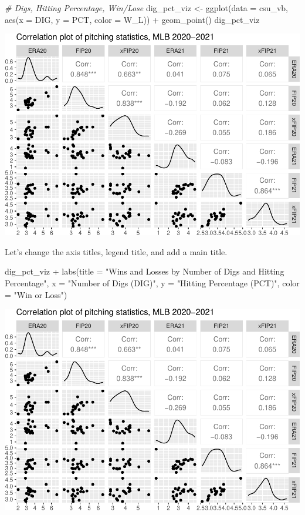 \documentclass[
  11pt,
]{book}
\newenvironment{Shaded}{\begin{snugshade}}{\end{snugshade}}
\newcommand{\AttributeTok}[1]{\textcolor[rgb]{0.77,0.63,0.00}{#1}}
\newcommand{\CommentTok}[1]{\textcolor[rgb]{0.56,0.35,0.01}{\textit{#1}}}
\newcommand{\FunctionTok}[1]{\textcolor[rgb]{0.00,0.00,0.00}{#1}}
\newcommand{\NormalTok}[1]{#1}
\newcommand{\OtherTok}[1]{\textcolor[rgb]{0.56,0.35,0.01}{#1}}
\newcommand{\SpecialCharTok}[1]{\textcolor[rgb]{0.00,0.00,0.00}{#1}}
\newcommand{\StringTok}[1]{\textcolor[rgb]{0.31,0.60,0.02}{#1}}
\theoremstyle{definition}
\theoremstyle{definition}
\theoremstyle{definition}
\theoremstyle{definition}
\theoremstyle{remark}
\begin{document}
\begin{Shaded}
\begin{Highlighting}[]
\CommentTok{\# Digs, Hitting Percentage, Win/Lose}
\NormalTok{dig\_pct\_viz }\OtherTok{\textless{}{-}} \FunctionTok{ggplot}\NormalTok{(}\AttributeTok{data =}\NormalTok{ csu\_vb, }\FunctionTok{aes}\NormalTok{(}\AttributeTok{x =}\NormalTok{ DIG, }\AttributeTok{y =}\NormalTok{ PCT, }\AttributeTok{color =}\NormalTok{ W\_L)) }\SpecialCharTok{+} \FunctionTok{geom\_point}\NormalTok{()}
\NormalTok{dig\_pct\_viz}
\end{Highlighting}
\end{Shaded}

\includegraphics{series_files/figure-latex/unnamed-chunk-19-1.pdf}

Let's change the axis titles, legend title, and add a main title.

\begin{Shaded}
\begin{Highlighting}[]
\NormalTok{dig\_pct\_viz }\SpecialCharTok{+} \FunctionTok{labs}\NormalTok{(}\AttributeTok{title =} \StringTok{"Wins and Losses by Number of Digs and Hitting Percentage"}\NormalTok{,}
    \AttributeTok{x =} \StringTok{"Number of Digs (DIG)"}\NormalTok{, }\AttributeTok{y =} \StringTok{"Hitting Percentage (PCT)"}\NormalTok{, }\AttributeTok{color =} \StringTok{"Win or Loss"}\NormalTok{)}
\end{Highlighting}
\end{Shaded}

\includegraphics{series_files/figure-latex/unnamed-chunk-20-1.pdf}
\end{document}
